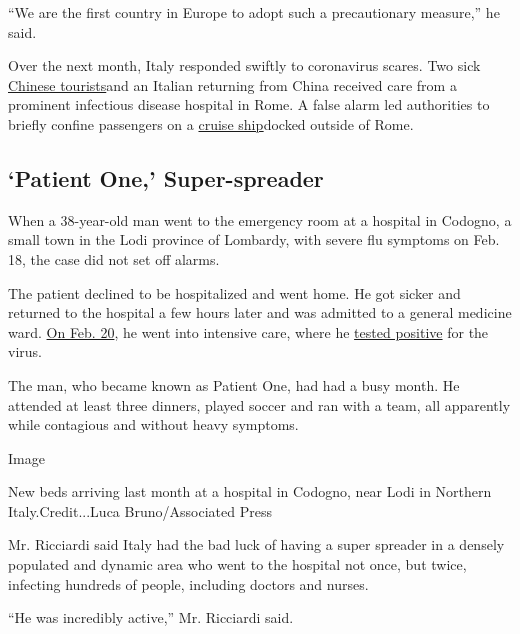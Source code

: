 ``We are the first country in Europe to adopt such a precautionary
measure,'' he said.

Over the next month, Italy responded swiftly to coronavirus scares. Two
sick
\href{https://www.nytimes3xbfgragh.onion/2020/01/31/world/asia/coronavirus-china.html?searchResultPosition=22}{Chinese
tourists}and an Italian returning from China received care from a
prominent infectious disease hospital in Rome. A false alarm led
authorities to briefly confine passengers on a
\href{https://www.nytimes3xbfgragh.onion/2020/01/30/world/europe/italy-coronavirus-cruise.html?searchResultPosition=56}{cruise
ship}docked outside of Rome.

\hypertarget{patient-one-super-spreader}{%
\subsection{`Patient One,'
Super-spreader}\label{patient-one-super-spreader}}

When a 38-year-old man went to the emergency room at a hospital in
Codogno, a small town in the Lodi province of Lombardy, with severe flu
symptoms on Feb. 18, the case did not set off alarms.

The patient declined to be hospitalized and went home. He got sicker and
returned to the hospital a few hours later and was admitted to a general
medicine ward.
\href{https://www.repubblica.it/cronaca/2020/03/06/news/l_anestesista_di_codogno_per_mattia_era_tutto_inutile_cosi_ho_avuto_la_folle_idea_di_pensare_al_coronavirus_-250380291/}{On
Feb. 20}, he went into intensive care, where he
\href{https://www.nytimes3xbfgragh.onion/2020/02/21/world/asia/china-coronavirus.html?searchResultPosition=4}{tested
positive} for the virus.

The man, who became known as Patient One, had had a busy month. He
attended at least three dinners, played soccer and ran with a team, all
apparently while contagious and without heavy symptoms.

Image

New beds arriving last month at a hospital in Codogno, near Lodi in
Northern Italy.Credit...Luca Bruno/Associated Press

Mr. Ricciardi said Italy had the bad luck of having a super spreader in
a densely populated and dynamic area who went to the hospital not once,
but twice, infecting hundreds of people, including doctors and nurses.

``He was incredibly active,'' Mr. Ricciardi said.

